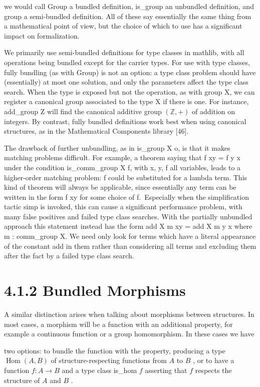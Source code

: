 \documentclass[
]{article}
\begin{document}
we would call Group a bundled definition, is\_group an unbundled
definition, and group a semi-bundled definition. All of these say
essentially the same thing from a mathematical point of view, but the
choice of which to use has a significant impact on formalization.

We primarily use semi-bundled definitions for type classes in mathlib,
with all operations being bundled except for the carrier types. For use
with type classes, fully bundling (as with Group) is not an option: a
type class problem should have (essentially) at most one solution, and
only the parameters affect the type class search. When the type is
exposed but not the operation, as with group X, we can register a
canonical group associated to the type X if there is one. For instance,
add\_group Z will find the canonical additive group \((\mathbb{Z}, + )\)
of addition on integers. By contrast, fully bundled definitions work
best when using canonical structures, as in the Mathematical Components
library {[}46{]}.

The drawback of further unbundling, as in is\_group X o, is that it
makes matching problems difficult. For example, a theorem saying that f
xy = f y x under the condition is\_comm\_group X f, with x, y, f all
variables, leads to a higher-order matching problem: f could be
substituted for a lambda term. This kind of theorem will always be
applicable, since essentially any term can be written in the form f xy
for some choice of f.~Especially when the simplification tactic simp is
invoked, this can cause a significant performance problem, with many
false positives and failed type class searches. With the partially
unbundled approach this statement instead has the form add X m xy = add
X m y x where m : comm\_group X. We need only look for terms which have
a literal appearance of the constant add in them rather than considering
all terms and excluding them after the fact by a failed type class
search.

\section{4.1.2 Bundled Morphisms}\label{bundled-morphisms}

A similar distinction arises when talking about morphisms between
structures. In most cases, a morphism will be a function with an
additional property, for example a continuous function or a group
homomorphism. In these cases we have

two options: to bundle the function with the property, producing a type
\(\operatorname{Hom}(A, B)\) of structure-respecting functions from
\(A\) to \(B\) , or to have a function \(f: A \to B\) and a type class
is\_hom \(f\) asserting that \(f\) respects the structure of \(A\) and
\(B\) .
\end{document}
